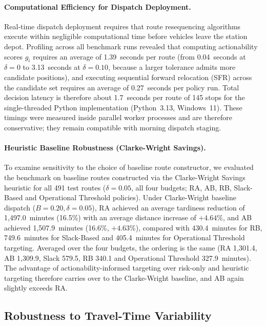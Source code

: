 \documentclass[11pt,a4paper]{article}
\begin{document}
\paragraph{Computational Efficiency for Dispatch Deployment.}
Real-time dispatch deployment requires that route resequencing algorithms execute within negligible computational time before vehicles leave the station depot. Profiling across all benchmark runs revealed that computing actionability scores $g_i$ requires an average of 1.39~seconds per route (from 0.04~seconds at $\delta = 0$ to 3.13~seconds at $\delta = 0.10$, because a larger tolerance admits more candidate positions), and executing sequential forward relocation (SFR) across the candidate set requires an average of 0.27~seconds per policy run. Total decision latency is therefore about 1.7~seconds per route of 145 stops for the single-threaded Python implementation (Python~3.13, Windows~11). These timings were measured inside parallel worker processes and are therefore conservative; they remain compatible with morning dispatch staging.

\paragraph{Heuristic Baseline Robustness (Clarke-Wright Savings).}
To examine sensitivity to the choice of baseline route constructor, we evaluated the benchmark on baseline routes constructed via the Clarke-Wright Savings heuristic for all 491 test routes ($\delta = 0.05$, all four budgets; RA, AB, RB, Slack-Based and Operational Threshold policies). Under Clarke-Wright baseline dispatch ($B=0.20, \delta=0.05$), RA achieved an average tardiness reduction of 1,497.0~minutes (16.5\%) with an average distance increase of $+4.64\%$, and AB achieved 1,507.9~minutes (16.6\%, $+4.63\%$), compared with 430.4~minutes for RB, 749.6~minutes for Slack-Based and 405.4~minutes for Operational Threshold targeting. Averaged over the four budgets, the ordering is the same (RA 1,301.4, AB 1,309.9, Slack 579.5, RB 340.1 and Operational Threshold 327.9~minutes). The advantage of actionability-informed targeting over risk-only and heuristic targeting therefore carries over to the Clarke-Wright baseline, and AB again slightly exceeds RA.

\subsection{Robustness to Travel-Time Variability}\label{sec:res-scenarios}
\end{document}
